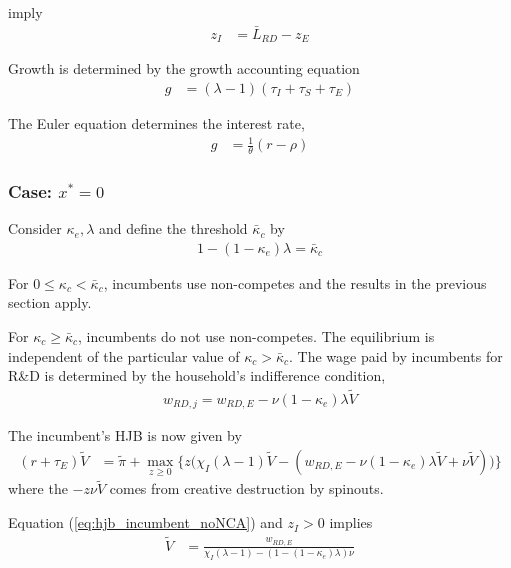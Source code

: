 \documentclass[12pt,english]{article}
\theoremstyle{remark}
\begin{document}
imply 
\begin{align}
	z_I &= \bar{L}_{RD} - z_E \label{eq:zI_asFuncZe}
\end{align}

Growth is determined by the growth accounting equation
\begin{align}
g &= (\lambda - 1)(\tau_I + \tau_S + \tau_E) \label{eq:growth_accounting}
\end{align}

The Euler equation determines the interest rate, 
\begin{align}
	g &= \frac{1}{\theta} (r - \rho) \label{eq:euler}
\end{align}

\subsubsection{Case: $x^* = 0$}

Consider $\kappa_{e}, \lambda$ and define the threshold $\bar{\kappa}_c$ by 
\begin{align}
	1-(1-\kappa_{e})\lambda= \bar{\kappa}_c \label{eq_nca_threshold}
\end{align}

For $0 \le \kappa_{c} < \bar{\kappa}_c$, incumbents use non-competes and the results in the previous section apply.

For $\kappa_{c} \ge \bar{\kappa}_c$, incumbents do not use non-competes. The equilibrium is independent of the particular value of $\kappa_{c} > \bar{\kappa}_c$. The wage paid by incumbents for R\&D is determined by the household's indifference condition,
\begin{align}
	w_{RD,j} = w_{RD,E}- \nu (1-\kappa_{e}) \lambda \tilde{V} \label{eq:wage_rd}
\end{align}

The incumbent's HJB is now given by 
\begin{align}
	(r + \tau_E) \tilde{V} &= \tilde{\pi} + \max_{z \ge 0 } \Big\{ z \Big( \chi_I (\lambda - 1) \tilde{V} - (w_{RD,E} - \nu (1-\kappa_{e}) \lambda \tilde{V} + \nu \tilde{V} )\Big)  \Big\}\label{eq:hjb_incumbent_noNCA}
\end{align}
where the $-z \nu \tilde{V}$ comes from creative destruction by spinouts.

Equation (\ref{eq:hjb_incumbent_noNCA}) and $z_I > 0$ implies
\begin{align}
\tilde{V} &= \frac{w_{RD,E}}{\chi_I(\lambda - 1) - (1-(1-\kappa_{e})\lambda)\nu} \label{eq:hjb_incumbent_foc_noNCA}
\end{align}
\end{document}
